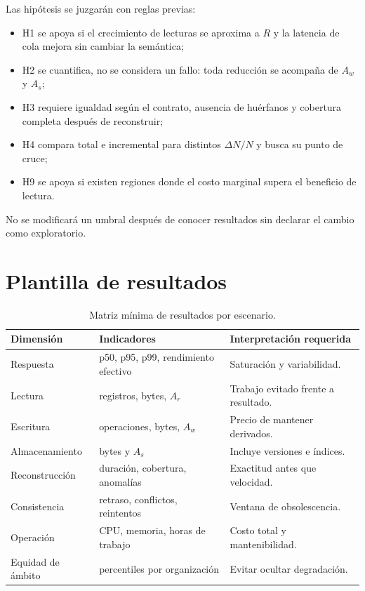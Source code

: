 Las hipótesis se juzgarán con reglas previas:

\begin{itemize}[leftmargin=*]
  \item H1 se apoya si el crecimiento de lecturas se aproxima a $R$ y la latencia de
  cola mejora sin cambiar la semántica;
  \item H2 se cuantifica, no se considera un fallo: toda reducción se acompaña de
  $A_w$ y $A_s$;
  \item H3 requiere igualdad según el contrato, ausencia de huérfanos y cobertura
  completa después de reconstruir;
  \item H4 compara total e incremental para distintos $\Delta N/N$ y busca su punto de
  cruce;
  \item H9 se apoya si existen regiones donde el costo marginal supera el beneficio de
  lectura.
\end{itemize}

No se modificará un umbral después de conocer resultados sin declarar el cambio como
exploratorio.

\section{Plantilla de resultados}

\begin{table}[H]
\centering
\caption{Matriz mínima de resultados por escenario.}
\label{tab:plantilla-resultados}
\begin{tabularx}{\textwidth}{p{3.7cm}X X}
\toprule
Dimensión & Indicadores & Interpretación requerida \\
\midrule
Respuesta & p50, p95, p99, rendimiento efectivo & Saturación y variabilidad.\\
Lectura & registros, bytes, $A_r$ & Trabajo evitado frente a resultado.\\
Escritura & operaciones, bytes, $A_w$ & Precio de mantener derivados.\\
Almacenamiento & bytes y $A_s$ & Incluye versiones e índices.\\
Reconstrucción & duración, cobertura, anomalías & Exactitud antes que velocidad.\\
Consistencia & retraso, conflictos, reintentos & Ventana de obsolescencia.\\
Operación & CPU, memoria, horas de trabajo & Costo total y mantenibilidad.\\
Equidad de ámbito & percentiles por organización & Evitar ocultar degradación.\\
\bottomrule
\end{tabularx}
\end{table}

